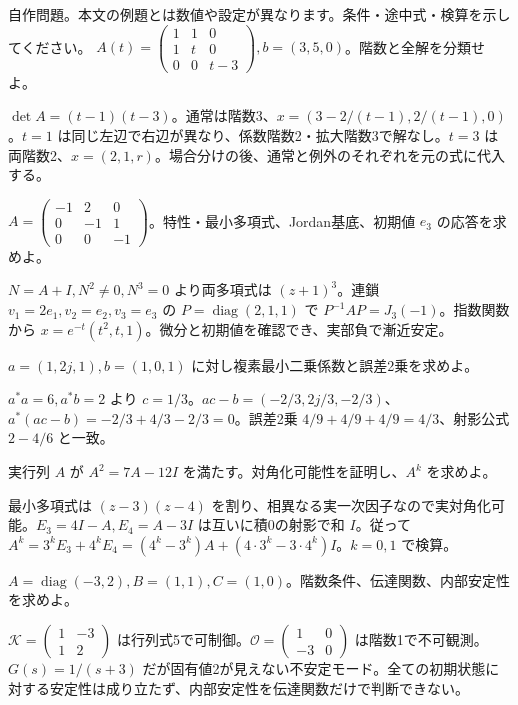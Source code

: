 \documentclass[11pt]{article}
\begin{document}
自作問題。本文の例題とは数値や設定が異なります。条件・途中式・検算を示してください。
\problem[総合1：文字入り連立式]
$A(t)=\begin{pmatrix}1&1&0\\1&t&0\\0&0&t-3\end{pmatrix},b=(3,5,0)$。階数と全解を分類せよ。
\begin{ans}
$\det A=(t-1)(t-3)$。通常は階数3、$x=(3-2/(t-1),2/(t-1),0)$。$t=1$ は同じ左辺で右辺が異なり、係数階数2・拡大階数3で解なし。$t=3$ は両階数2、$x=(2,1,r)$。場合分けの後、通常と例外のそれぞれを元の式に代入する。
\end{ans}
\problem[総合2：Jordanと応答]
$A=\begin{pmatrix}-1&2&0\\0&-1&1\\0&0&-1\end{pmatrix}$。特性・最小多項式、Jordan基底、初期値 $e_3$ の応答を求めよ。
\begin{ans}
$N=A+I,N^2\ne0,N^3=0$ より両多項式は $(z+1)^3$。連鎖 $v_1=2e_1,v_2=e_2,v_3=e_3$ の $P=\operatorname{diag}(2,1,1)$ で $P^{-1}AP=J_3(-1)$。指数関数から $x=e^{-t}(t^2,t,1)$。微分と初期値を確認でき、実部負で漸近安定。
\end{ans}
\newpage
\problem[総合3：複素近似]
$a=(1,2j,1),b=(1,0,1)$ に対し複素最小二乗係数と誤差2乗を求めよ。
\begin{ans}
$a^*a=6,a^*b=2$ より $c=1/3$。$ac-b=(-2/3,2j/3,-2/3)$、$a^*(ac-b)=-2/3+4/3-2/3=0$。誤差2乗 $4/9+4/9+4/9=4/3$、射影公式 $2-4/6$ と一致。
\end{ans}
\problem[総合4：証明と累乗]
実行列 $A$ が $A^2=7A-12I$ を満たす。対角化可能性を証明し、$A^k$ を求めよ。
\begin{ans}
最小多項式は $(z-3)(z-4)$ を割り、相異なる実一次因子なので実対角化可能。$E_3=4I-A,E_4=A-3I$ は互いに積0の射影で和 $I$。従って $A^k=3^kE_3+4^kE_4=(4^k-3^k)A+(4\cdot3^k-3\cdot4^k)I$。$k=0,1$ で検算。
\end{ans}
\newpage
\problem[総合5：内部と入出力]
$A=\operatorname{diag}(-3,2),B=(1,1),C=(1,0)$。階数条件、伝達関数、内部安定性を求めよ。
\begin{ans}
$\mathcal K=\begin{pmatrix}1&-3\\1&2\end{pmatrix}$ は行列式5で可制御。$\mathcal O=\begin{pmatrix}1&0\\-3&0\end{pmatrix}$ は階数1で不可観測。$G(s)=1/(s+3)$ だが固有値2が見えない不安定モード。全ての初期状態に対する安定性は成り立たず、内部安定性を伝達関数だけで判断できない。
\end{ans}
\end{document}
